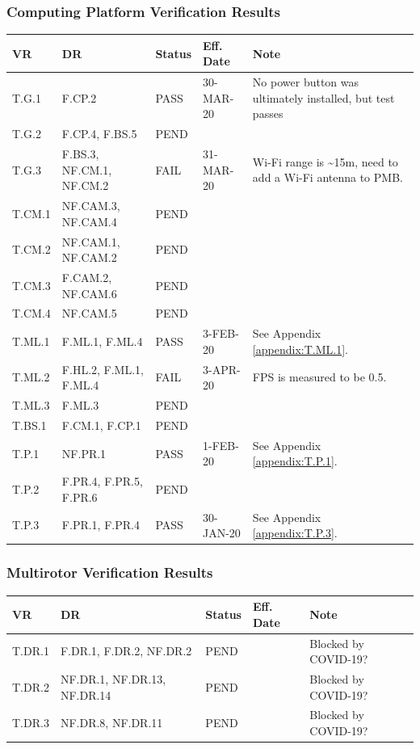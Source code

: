 \documentclass[10pt,letterpaper]{article}
\begin{document}
\subsubsection{Computing Platform Verification Results}
\begin{table}[H]
	\centering
	\begin{tabular}{lllll}
	\hline
	\textbf{VR} & \textbf{DR} & \textbf{Status} & \textbf{Eff. Date} & \textbf{Note}\\
	\hline
	T.G.1 & F.CP.2 & PASS & 30-MAR-20  & No power button was ultimately installed, but test passes\\
	T.G.2 & F.CP.4, F.BS.5 & PEND   & \\
	T.G.3 & F.BS.3, NF.CM.1, NF.CM.2 & FAIL   & 31-MAR-20 & Wi-Fi range is \textasciitilde 15m, need to add a Wi-Fi antenna to PMB. \\
	\hline
	T.CM.1 & NF.CAM.3, NF.CAM.4   & PEND   & \\
	T.CM.2 & NF.CAM.1, NF.CAM.2   & PEND   & \\
	T.CM.3 & F.CAM.2, NF.CAM.6   & PEND   & \\
	T.CM.4 & NF.CAM.5   & PEND   & \\
	\hline
	T.ML.1 & F.ML.1, F.ML.4 & PASS & 3-FEB-20 & See Appendix \ref{appendix:T.ML.1}.\\
	T.ML.2 & F.HL.2, F.ML.1, F.ML.4 & FAIL  & 3-APR-20 & FPS is measured to be 0.5. \\
    T.ML.3 & F.ML.3 & PEND   & \\
    \hline
    T.BS.1 & F.CM.1, F.CP.1 & PEND   & \\
    \hline
    T.P.1 & NF.PR.1 & PASS   & 1-FEB-20 & See Appendix \ref{appendix:T.P.1}.\\
    T.P.2 & F.PR.4, F.PR.5, F.PR.6 & PEND   & \\
    T.P.3 & F.PR.1, F.PR.4 & PASS   & 30-JAN-20 & See Appendix \ref{appendix:T.P.3}. \\
	\hline
	\end{tabular}
\end{table}

\subsubsection{Multirotor Verification Results}
\begin{table}[H]
	\centering
	\begin{tabular}{lllll}
	\hline
	\textbf{VR} & \textbf{DR} & \textbf{Status} & \textbf{Eff. Date} & \textbf{Note}\\
	\hline
    T.DR.1 & F.DR.1, F.DR.2, NF.DR.2 & PEND  & & Blocked by COVID-19?\\
    T.DR.2 & NF.DR.1, NF.DR.13, NF.DR.14  & PEND &  & Blocked by COVID-19?\\
	T.DR.3 & NF.DR.8, NF.DR.11 & PEND &  & Blocked by COVID-19?\\
	\hline
	\end{tabular}
\end{table}
\end{document}
